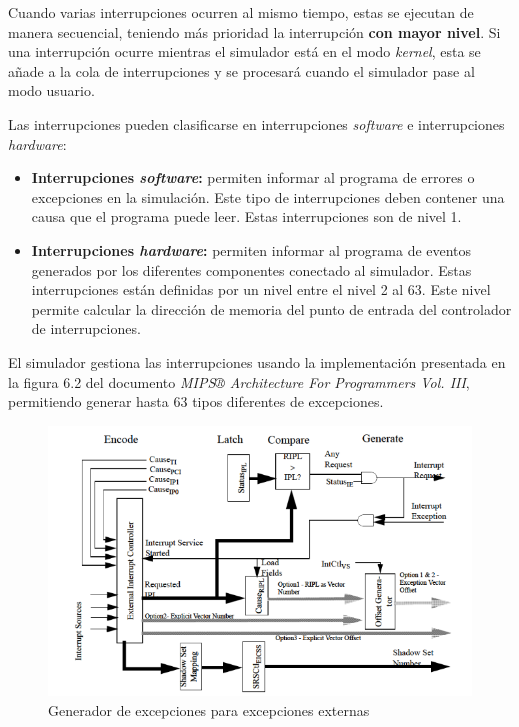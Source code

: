 \noindent Cuando varias interrupciones ocurren al mismo tiempo,
estas se ejecutan de manera secuencial, teniendo más prioridad
la interrupción \textbf{con mayor nivel}.
Si una interrupción ocurre mientras el simulador está en el
modo \textit{kernel}, esta se añade a la cola de interrupciones
y se procesará cuando el simulador pase al modo usuario.

\noindent Las interrupciones pueden clasificarse en interrupciones
\textit{software} e interrupciones \textit{hardware}:
\begin{itemize}
    \item \textbf{Interrupciones \textit{software}:} permiten informar
    al programa de errores o excepciones en la simulación.
    Este tipo de interrupciones deben contener una causa que
    el programa puede leer.
    Estas interrupciones son de nivel 1.
    \item \textbf{Interrupciones \textit{hardware}:} permiten informar
    al programa de eventos generados por los diferentes componentes
    conectado al simulador.
    Estas interrupciones están definidas por un nivel entre el
    nivel 2 al 63.
    Este nivel permite calcular la dirección de memoria
    del punto de entrada del controlador de interrupciones.
\end{itemize}

\noindent El simulador gestiona las interrupciones usando la
implementación presentada en la figura 6.2 del documento
\textit{MIPS® Architecture For Programmers Vol. III}\cite{MIPS_VOL_3},
permitiendo generar hasta 63 tipos diferentes de excepciones.

\begin{figure}[H]
    \centering
    \includegraphics[width=\textwidth]{images/mips/mips-exception-generator}
    \caption{Generador de excepciones para excepciones externas}
    \label{fig:mips-exception-generator}
\end{figure}

